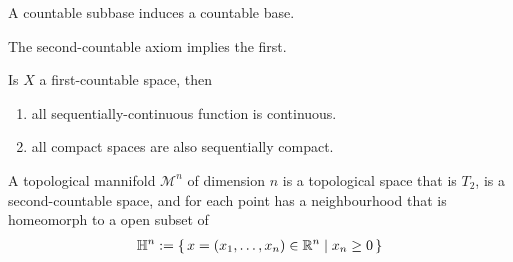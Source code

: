 \begin{rembox}
    \begin{remark}
        A countable subbase induces a countable base.
    \end{remark}
\end{rembox}

\begin{thmbox}
    \begin{lemma}
        The second-countable axiom implies the first.
    \end{lemma}
\end{thmbox}

\begin{thmbox}
    \begin{lemma}
        Is \(X\) a first-countable space, then
        \begin{enumerate}
            \item all sequentially-continuous function is continuous.
            \item all compact spaces are also sequentially compact.
        \end{enumerate}
    \end{lemma}
\end{thmbox}

\begin{defbox}
    \begin{definition}
        A topological mannifold \(\mathcal{M}^n\) of dimension \(n\) is a topological space that is \(T_2\), is a second-countable space, and for each point has a neighbourhood that is homeomorph to a open subset of
        \begin{align*}
            \mathbb{H}^n := \left\{\, x = (x_1, \ldots, x_n) \in \mathbb{R}^n \mid x_n \geq 0 \,\right\}
        \end{align*}
    \end{definition}
\end{defbox}